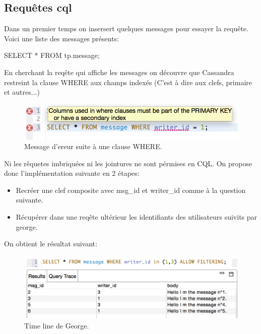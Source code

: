 \subsection{Requêtes cql}
\par Dans un premier temps on insersert quelques messages pour essayer la requête.
Voici une liste des messages présents:\newline
\begin{tt}SELECT * FROM tp.message;\end{tt}

\par En cherchant la reqête qui affiche les messages on découvre que Cassandra 
restreint la clause WHERE aux champs indexés (C'est à dire aux clefs, primaire et autres...)

\begin{figure}[ht]
\centering
\includegraphics[scale=0.7]{img/where_clause.png}
\caption{Message d'ereur suite à une clause WHERE.}
\end{figure}

\par Ni les rêquetes imbriquées ni les jointures ne sont pérmises en CQL. 
On propose donc l'implémentation suivante en 2 étapes:
\begin{itemize}
\item Recréer une clef composite avec msg\_id et writer\_id comme à la question suivante.
\item Récupérer dans une reqête ultérieur les identifiants des utilisateurs suivits par george.
\end{itemize}

On obtient le résultat suivant:

\begin{figure}[ht]
\centering
\includegraphics[scale=0.7]{img/george_time_line.png}
\caption{Time line de George.}
\end{figure}


